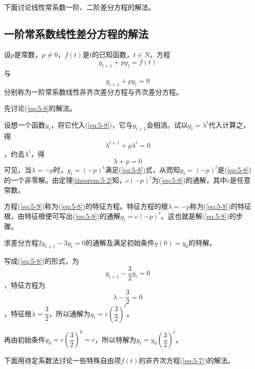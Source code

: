 		下面讨论线性常系数一阶、二阶差分方程的解法。

		\subsection{一阶常系数线性差分方程的解法}

		 设$p$是常数，$p \neq 0$，$f(t)$是$t$的已知函数，$t \in N$。方程
		\begin{equation}\label{eq:5-7}
			y_{t+1} + py_t = f(t)
		\end{equation}
		与
		\begin{equation}\label{eq:5-8}
			y_{t+1} + py_t = 0
		\end{equation}
		分别称为{\heiti 一阶常系数线性非齐次差分方程}与{\heiti 齐次差分方程}。

		先讨论(\ref{eq:5-8}的解法。

		设想一个函数$y_t$，将它代入(\ref{eq:5-8})，它与$y_{t+1}$会相消。试以$y_t = \lambda ^t $代入计算之，得$$ \lambda ^{t+1} + p \lambda ^t = 0$$，约去$\lambda ^t$，得
		\begin{equation}\label{eq:5-9}
			\lambda + p = 0
		\end{equation}
		可见，当$\lambda = -p$时，$y_t = (-p) ^t$满足(\ref{eq:5-8})式，从而知$y_t = (-p) ^t$是(\ref{eq:5-8})的一个非零解。由定理\ref{theorem:5-2}知，$c(-p)^t$为(\ref{eq:5-8})的通解，其中$c$是任意常数。

		方程(\ref{eq:5-9})称为(\ref{eq:5-8})的特征方程。特征方程的根$\lambda = -p$称为(\ref{eq:5-8})的特征根，由特征根便可写出(\ref{eq:5-8})的通解$y_t = c(-p)^t$。这也就是解(\ref{eq:5-8})的步骤。

		\example 求差分方程$2y_{t+1} - 3y_t = 0$的通解及满足初始条件$y(0) = y_0$的特解。

		\answer 写成(\ref{eq:5-8})的形式，为$$y_{t+1} - \frac{3}{2}y_t = 0$$，特征方程为$$\lambda - \frac{3}{2} = 0$$，特征根$\lambda = \dfrac{3}{2}$，所以通解为$y_t = c\left(\dfrac{3}{2}\right) ^t$。

		再由初始条件$y_0 = c\left(\dfrac{3}{2}\right) ^0 = c$，所以特解为$y_t = y_0\left(\dfrac{3}{2}\right) ^t$。

		下面用待定系数法讨论一些特殊自由项$f(t)$的非齐次方程(\ref{eq:5-7})的解法。

